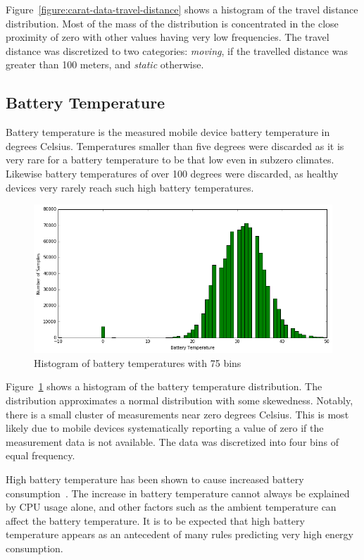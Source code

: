 Figure~\ref{figure:carat-data-travel-distance} shows a histogram of the travel distance distribution. Most of the mass of the distribution is concentrated in the close proximity of zero with other values having very low frequencies. The travel distance was discretized to two categories: \textit{moving}, if the travelled distance was greater than 100 meters, and \textit{static} otherwise.

\subsection{Battery Temperature}  

Battery temperature is the measured mobile device battery temperature in degrees Celsius. Temperatures smaller than five degrees were discarded as it is very rare for a battery temperature to be that low even in subzero climates. Likewise battery temperatures of over 100 degrees were discarded, as healthy devices very rarely reach such high battery temperatures.

\begin{figure} %
	\centering
	\includegraphics[width=\textwidth]{images/carat-data/battery_temperature.png}
	\caption{Histogram of battery temperatures with 75 bins}
	\label{figure:carat-data-battery-temperature}
\end{figure}  

Figure~\ref{figure:carat-data-battery-temperature} shows a histogram of the battery temperature distribution. The distribution approximates a normal distribution with some skewedness. Notably, there is a small cluster of measurements near zero degrees Celsius. This is most likely due to mobile devices systematically reporting a value of zero if the measurement data is not available. The data was discretized into four bins of equal frequency.

High battery temperature has been shown to cause increased battery consumption~\cite{7146507}. The increase in battery temperature cannot always be explained by CPU usage alone, and other factors such as the ambient temperature can affect the battery temperature. It is to be expected that high battery temperature appears as an antecedent of many rules predicting very high energy consumption.

